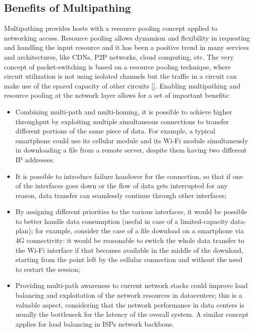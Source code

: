 \subsection{Benefits of Multipathing}
Multipathing provides hosts with a resource pooling concept applied to networking access. Resource pooling allows dynamism and flexibility in requesting and handling the input resource and it has been a positive trend in many services and architectures, like CDNs, P2P networks, cloud computing, etc. The very concept of packet-switching is based on a resource pooling technique, where circuit utilization is not using isolated channels but the traffic in a circuit can make use of the spared capacity of other circuits [\href{https://www.cl.cam.ac.uk/~as2330/docs/multipath-survey.pdf}]. Enabling multipathing and resource pooling at the network layer allows for a set of important benefits:
\begin{itemize}
  \item Combining multi-path and multi-homing, it is possible to achieve higher throughput by exploiting multiple simultaneous connections to transfer different portions of the same piece of data. For example, a typical smartphone could use its cellular module and its Wi-Fi module simultaneusly in downloading a file from a remote server, despite them having two different IP addresses.
  \item It is possible to introduce failure handover for the connection, so that if one of the interfaces goes down or the flow of data gets interrupted for any reason, data transfer can seamlessly continue through other interfaces;
  \item By assigning different priorities to the various interfaces, it would be possible to better handle data consumption (useful in case of a limited-capacity data-plan); for example, consider the case of a file download on a smartphone via 4G connectivity: it would be reasonable to switch the whole data transfer to the Wi-Fi interface if that becomes available in the middle of the download, starting from the point left by the cellular connection and without the need to restart the session;
  \item Providing multi-path awareness to current network stacks could improve load balancing and exploitation of the network resources in datacenters; this is a valuable aspect, considering that the network performance in data centers is usually the bottleneck for the latency of the overall system. A similar concept applies for load balancing in ISPs network backbone.
\end{itemize}

